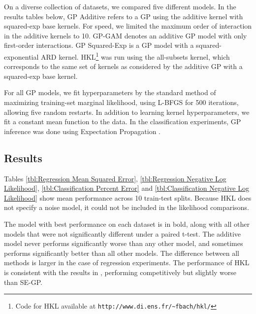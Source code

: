 On a diverse collection of datasets, we compared five different models.  In the results tables below, GP Additive refers to a GP using the additive kernel with squared-exp base kernels.  For speed, we limited the maximum order of interaction in the additive kernels to 10.  GP-GAM denotes an additive GP model with only first-order interactions.  GP Squared-Exp is a GP model with a squared-exponential ARD kernel.  HKL\footnote{Code for HKL available at \texttt{http://www.di.ens.fr/\textasciitilde fbach/hkl/}} was run using the all-subsets kernel, which corresponds to the same set of kernels as considered by the additive GP with a squared-exp base kernel.     

For all GP models, we fit hyperparameters by the standard method of maximizing training-set marginal likelihood, using L-BFGS \cite{nocedal1980updating} for 500 iterations, allowing five random restarts.  In addition to learning kernel hyperparameters, we fit a constant mean function to the data.
%
In the classification experiments, GP inference was done using Expectation Propagation \cite{minka2001expectation}.
 
\subsection{Results}

Tables \ref{tbl:Regression Mean Squared Error}, \ref{tbl:Regression Negative Log Likelihood}, \ref{tbl:Classification Percent Error} and \ref{tbl:Classification Negative Log Likelihood} show mean performance across 10 train-test splits.  Because HKL does not specify a noise model, it could not be included in the likelihood comparisons.






The model with best performance on each dataset is in bold, along with all other models that were not significantly different under a paired t-test. The additive model never performs significantly worse than any other model, and sometimes performs significantly better than all other models.  The difference between all methods is larger in the case of regression experiments. The performance of HKL is consistent with the results in \cite{DBLP:journals/corr/abs-0909-0844}, performing competitively but slightly worse than SE-GP.%


